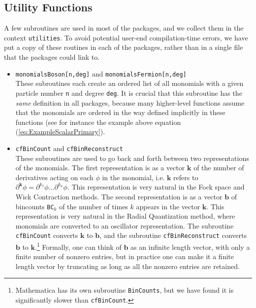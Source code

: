 \documentclass[12pt]{article}
\newcommand{\p}{\partial}
\newcommand{\bb}{\boldsymbol{b}}
\newcommand{\bk}{\boldsymbol{k}}
\begin{document}
\subsection{Utility Functions}

A few subroutines are used in most of the packages, and we collect them in the context {\tt utilities}.  To avoid potential user-end compilation-time errors, we have put a copy of these routines in each of the packages, %
rather than in a single file that the packages could link to.  

\begin{itemize}

\item {\tt monomialsBoson[n,deg]} and {\tt monomialsFermion[n,deg]}\\
These subroutines each create an ordered list of all monomials with a given particle number {\tt n} and degree {\tt deg}. It is crucial that this subroutine has the {\it same} definition in all packages, because many higher-level functions assume that the monomials are ordered in the way defined implicitly in these functions (see for instance the example above equation (\ref{eq:ExampleScalarPrimary}).  

\item {\tt cfBinCount} and {\tt cfBinReconstruct}\\
These subroutines are used to go back and forth between two representations of the monomials.  The first representation is as a vector $\bk$ of the number of derivatives acting on each $\phi$ in the monomial, i.e. $\bk$ refers to $\p^{\bk} \phi = \p^{k_1} \phi \dots \p^{k_n} \phi$.  This representation is very natural in the Fock space and Wick Contraction methods.  The second representation is as a vector $\bb$ of bincounts {\tt BC}$_k$ of the number of times $k$ appears in the vector $\bk$. This representation is very natural in the Radial Quantization method, where monomials are converted to an oscillator representation.  The subroutine {\tt cfBinCount} converts $\bk$ to $\bb$, and the subroutine {\tt cfBinReconstruct} converts $\bb$ to $\bk$.\footnote{Mathematica has its own subroutine {\tt BinCounts}, but we have found it is significantly slower than {\tt cfBinCount}. } Formally, one can think of $\bb$ as an infinite length vector, with only a finite number of nonzero entries, but in practice one can make it a finite length vector by truncating as long as all the nonzero entries are retained. 


\end{itemize}
\end{document}
